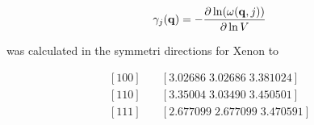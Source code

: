 \begin{equation}
  \label{eq:Gruneissen}
  \gamma_j(\mathbf{q}) = -\frac{\partial \ln (\omega (\mathbf{q},j))}{\partial \ln V}
\end{equation}

was calculated in the symmetri directions for Xenon to

\begin{equation*}
  \begin{split}
    [1 0 0] & \quad [3.02686 \; 3.02686 \; 3.381024] \\
    [1 1 0] & \quad [3.35004 \; 3.03490 \; 3.450501] \\
    [1 1 1] & \quad [2.677099 \; 2.677099 \; 3.470591]
  \end{split}
\end{equation*}
